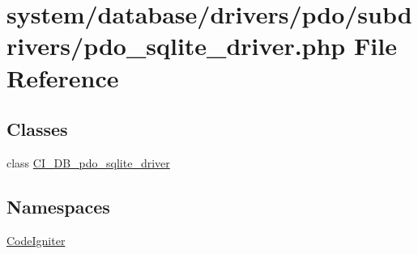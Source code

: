 \hypertarget{pdo__sqlite__driver_8php}{}\section{system/database/drivers/pdo/subdrivers/pdo\+\_\+sqlite\+\_\+driver.php File Reference}
\label{pdo__sqlite__driver_8php}
\subsection*{Classes}
\begin{DoxyCompactItemize}
\item 
class \mbox{\hyperlink{class_c_i___d_b__pdo__sqlite__driver}{C\+I\+\_\+\+D\+B\+\_\+pdo\+\_\+sqlite\+\_\+driver}}
\end{DoxyCompactItemize}
\subsection*{Namespaces}
\begin{DoxyCompactItemize}
\item 
 \mbox{\hyperlink{namespace_code_igniter}{Code\+Igniter}}
\end{DoxyCompactItemize}
